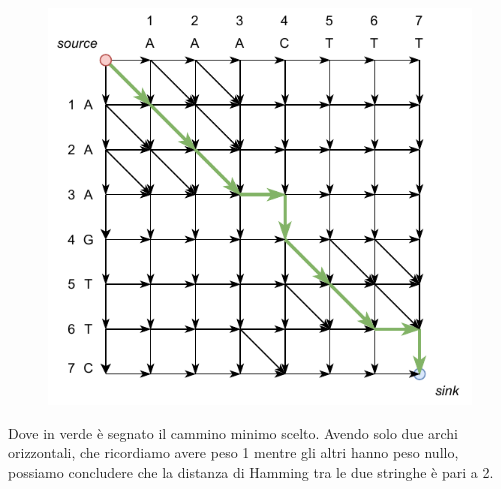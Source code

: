 \documentclass[a4paper,12pt, oneside]{book}
\begin{document}
\begin{figure}[H]
  \centering
  \includegraphics[scale = 1]{img/es3.pdf}
\end{figure}
\noindent
Dove in verde è segnato il cammino minimo scelto. Avendo solo due archi
orizzontali, che ricordiamo avere peso 1 mentre gli altri hanno peso nullo,
possiamo concludere che la distanza di Hamming tra le due stringhe è 
pari a 2.
\end{document}
